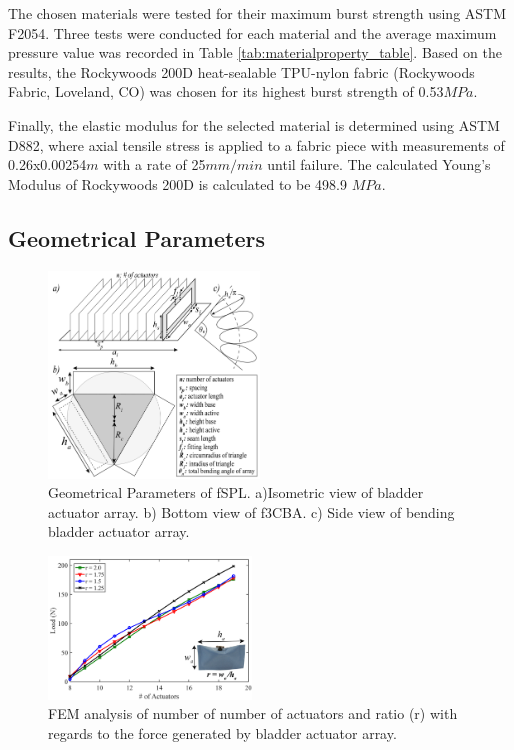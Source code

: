 \documentclass[letterpaper, 10 pt, conference]{ieeeconf}  %
\begin{document}
The chosen materials were tested for their maximum burst strength using ASTM F2054. Three tests were conducted for each material and the average maximum pressure value was recorded in Table \ref{tab:materialproperty_table}. Based on the results, the Rockywoods 200D heat-sealable TPU-nylon fabric (Rockywoods Fabric, Loveland, CO) was chosen for its highest burst strength of 0.53$MPa$.

Finally, the elastic modulus for the selected material is determined using ASTM D882, where axial tensile stress is applied to a fabric piece with measurements of 0.26x0.00254$m$ with a rate of 25$mm/min$ until failure. The calculated Young’s Modulus of Rockywoods 200D is calculated to be 498.9 $MPa$.



\subsection{Geometrical Parameters}

\begin{figure}[b!]
\centering
\includegraphics[width=0.5\textwidth]{Figures/geom_param_v5}
\caption{Geometrical Parameters of fSPL. a)Isometric view of bladder actuator array. b) Bottom view of f3CBA. c) Side view of bending bladder actuator array.}
\label{fig:geom_param}
\vspace{-1.5em}
\end{figure}


\begin{figure}[t!]
\centering
\includegraphics[width=0.48\textwidth]{Figures/fem_opti_v4}
\caption{FEM analysis of number of number of actuators and ratio (r) with regards to the force generated by bladder actuator array.}
\label{fig:fem_opti}
\vspace{-1.5em}
\end{figure}
\end{document}
